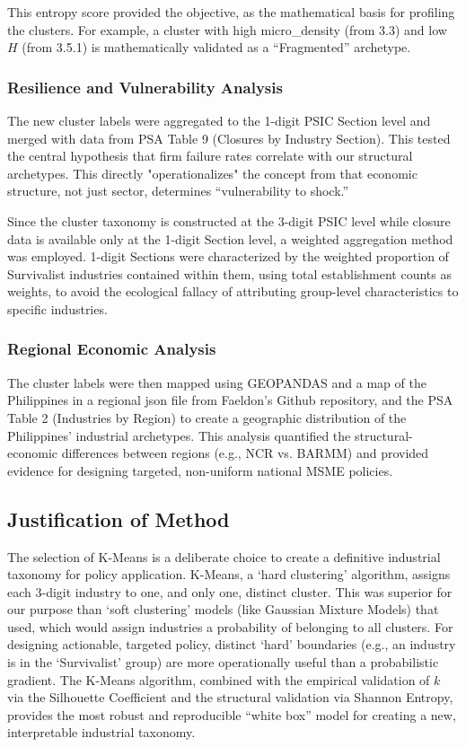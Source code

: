 \documentclass[acmtog, nonacm]{acmart}
\begin{document}
This entropy score provided the objective, as the mathematical basis for profiling the clusters. For example, a cluster with high micro\_density (from 3.3) and low $H$ (from 3.5.1) is mathematically validated as a ``Fragmented'' archetype.

\subsubsection{Resilience and Vulnerability Analysis}
The new cluster labels were aggregated to the 1-digit PSIC Section level and merged with data from PSA Table 9 (Closures by Industry Section). This tested the central hypothesis that firm failure rates correlate with our structural archetypes. This directly "operationalizes" the concept from \citet{shutters2024} that economic structure, not just sector, determines ``vulnerability to shock.''

Since the cluster taxonomy is constructed at the 3-digit PSIC level while closure data is available only at the 1-digit Section level, a weighted aggregation method was employed. 1-digit Sections were characterized by the weighted proportion of Survivalist industries contained within them, using total establishment counts as weights, to avoid the ecological fallacy of attributing group-level characteristics to specific industries.

\subsubsection{Regional Economic Analysis}
The cluster labels were then mapped using GEOPANDAS and a map of the Philippines in a regional json file from Faeldon's Github repository, and the PSA Table 2 (Industries by Region) to create a geographic distribution of the Philippines' industrial archetypes. This analysis quantified the structural-economic differences between regions (e.g., NCR vs. BARMM) and provided evidence for designing targeted, non-uniform national MSME policies.

\subsection{Justification of Method}
The selection of K-Means is a deliberate choice to create a definitive industrial taxonomy for policy application. K-Means, a `hard clustering' algorithm, assigns each 3-digit industry to one, and only one, distinct cluster. This was superior for our purpose than `soft clustering' models (like Gaussian Mixture Models) that \citet{nava2021} used, which would assign industries a probability of belonging to all clusters. For designing actionable, targeted policy, distinct `hard' boundaries (e.g., an industry is in the `Survivalist' group) are more operationally useful than a probabilistic gradient. The K-Means algorithm, combined with the empirical validation of $k$ via the Silhouette Coefficient and the structural validation via Shannon Entropy, provides the most robust and reproducible ``white box'' model for creating a new, interpretable industrial taxonomy.
\end{document}

